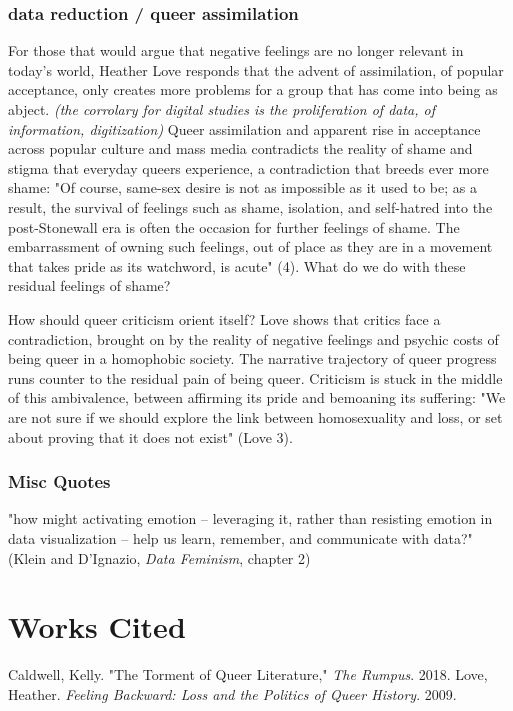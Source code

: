 \documentclass[11pt]{article}
\begin{document}
\subsubsection{data reduction / queer assimilation}
\label{sec:orgddbdd40}
For those that would argue that negative feelings are no longer
relevant in today's world, Heather Love responds that the advent of
assimilation, of popular acceptance, only creates more problems for a
group that has come into being as abject. \emph{(the corrolary for digital
studies is the proliferation of data, of information, digitization)}
Queer assimilation and apparent rise in acceptance across popular
culture and mass media contradicts the reality of shame and stigma
that everyday queers experience, a contradiction that breeds ever more
shame: "Of course, same-sex desire is not as impossible as it used to
be; as a result, the survival of feelings such as shame, isolation,
and self-hatred into the post-Stonewall era is often the occasion for
further feelings of shame. The embarrassment of owning such feelings,
out of place as they are in a movement that takes pride as its
watchword, is acute" (4). What do we do with these residual feelings
of shame?

How should queer criticism orient itself? Love shows that critics face
a contradiction, brought on by the reality of negative feelings and
psychic costs of being queer in a homophobic society. The narrative
trajectory of queer progress runs counter to the residual pain of
being queer. Criticism is stuck in the middle of this ambivalence,
between affirming its pride and bemoaning its suffering: "We are not
sure if we should explore the link between homosexuality and loss, or
set about proving that it does not exist" (Love 3).

\subsubsection{Misc Quotes}
\label{sec:org0bd2dd9}
"how might activating emotion – leveraging it, rather than resisting
emotion in data visualization – help us learn, remember, and
communicate with data?" (Klein and D'Ignazio, \emph{Data Feminism},
chapter 2)

\section{Works Cited}
\label{sec:orga76b19f}
Caldwell, Kelly. "The Torment of Queer Literature," \emph{The Rumpus}. 2018.
Love, Heather. \emph{Feeling Backward: Loss and the Politics of Queer History}. 2009.
\end{document}
